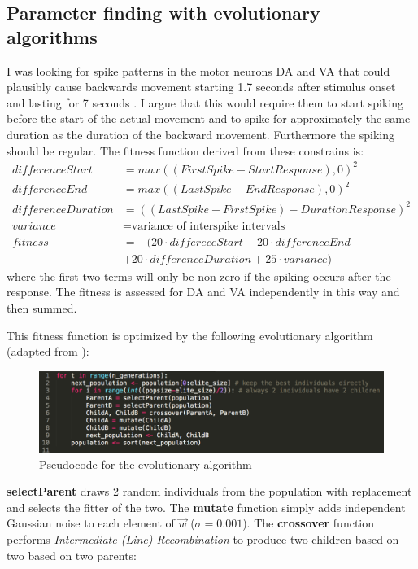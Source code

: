 \subsection{Parameter finding with evolutionary algorithms} %
\label{sub:parmeter_finding_with_evolutionary_algorithms}
I was looking for spike patterns in the motor neurons DA and VA that could plausibly cause backwards movement starting 1.7 seconds after stimulus onset and lasting for 7 seconds \cite{Ward2008}. I argue that this would require them to start spiking before the start of the actual movement and to spike for approximately the same duration as the duration of the backward movement. Furthermore the spiking should be regular. The fitness function derived from these constrains is:
\begin{align*}
 differenceStart &= max((FirstSpike - StartResponse),0)^2\\
 differenceEnd &= max((LastSpike - EndResponse),0)^2\\
 differenceDuration &= ((LastSpike - FirstSpike) - DurationResponse)^2\\
 variance &= \textrm{variance of interspike intervals} \\
 fitness &= - (20 \cdot differeceStart + 20 \cdot differenceEnd \\&+ 20 \cdot differenceDuration + 25 \cdot variance)
\end{align*}
where the first two terms will only be non-zero if the spiking occurs after the response. The fitness is assessed for DA and VA independently in this way and then summed. 

This fitness function is optimized by the following evolutionary algorithm (adapted from \cite{Luke2013Metaheuristics}):

\begin{figure}[H]
\includegraphics[width=\linewidth]{evolution}
\caption{Pseudocode for the evolutionary algorithm}
\end{figure}

\textbf{selectParent} draws 2 random individuals from the population with replacement and selects the fitter of the two. The \textbf{mutate} function simply adds independent Gaussian noise to each element of $\vec{w}$ ($\sigma = 0.001$). The \textbf{crossover} function performs \textit{Intermediate (Line) Recombination} to produce two children based on two based on two parents:

